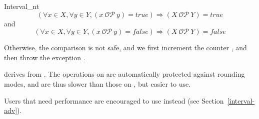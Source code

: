 \begin{ccClass} {Interval_nt}
$$
\left(\forall x \in X, \forall y \in Y, (x\ \mathcal{OP}\ y) = true\right)
\Rightarrow (X\ \mathcal{OP}\ Y) = true
$$
and
$$
\left(\forall x \in X, \forall y \in Y, (x\ \mathcal{OP}\ y) = false\right)
\Rightarrow (X\ \mathcal{OP}\ Y) =false
$$

Otherwise, the comparison is not safe, and we first increment the counter
, and then throw the exception
.

\ccImplementation

 derives from .
The operations on  are automatically protected against
rounding modes, and are thus slower than those on ,
but easier to use.

Users that need performance are encouraged to use 
instead (see Section~\ref{interval-adv}).

\end{ccClass}

